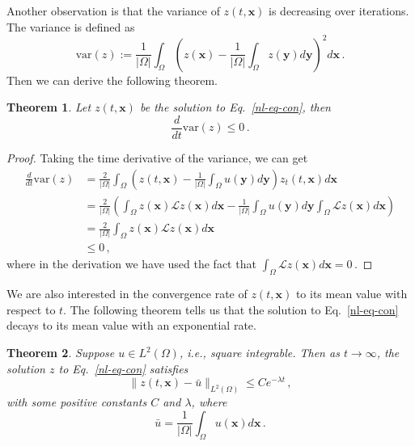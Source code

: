 \documentclass{article}
\newtheorem{theorem}{Theorem}
\newcommand{\xb}{\bm{x}}
\newcommand{\yb}{\bm{y}}
\begin{document}
Another observation is that the variance of $z(t,\xb)$ is decreasing over iterations. The variance is defined as
\begin{equation}
\text{var}(z):=\frac{1}{|\Omega|} \int_\Omega \left( z(\xb)-\frac{1}{|\Omega|}\int_\Omega z(\yb)d\yb \right)^2 d\xb\,.
\end{equation}
Then we can derive the following theorem.
\begin{theorem}
Let $z(t,\xb)$ be the solution to Eq.~\eqref{nl-eq-con}, then
\begin{equation}
\frac{d}{dt} \text{var}(z) \le 0\,.
\end{equation}
\end{theorem}
\begin{proof}
Taking the time derivative of the variance, we can get
\[
\begin{aligned}
\frac{d}{dt} \text{var}(z) &= \frac{2}{|\Omega|} \int_\Omega \left( z(t,\xb)-\frac{1}{|\Omega|}\int_\Omega u(\yb)d\yb\right) z_t(t,\xb) d\xb\\
&= \frac{2}{|\Omega|}\left(\int_\Omega z(\xb) \mathcal{L}z(\xb)d\xb - \frac{1}{|\Omega|}\int_\Omega u(\yb)d\yb \int_\Omega \mathcal{L}z(\xb)d\xb\right)\\
&=\frac{2}{|\Omega|}\int_\Omega z(\xb) \mathcal{L}z(\xb)d\xb\\
&\le 0\,,
\end{aligned}
\]
where in the derivation we have used the fact that $\int_\Omega \mathcal{L}z(\xb)d\xb = 0$\,.
\end{proof}


We are also interested in the convergence rate of $z(t,\xb)$ to its mean value with respect to $t$. The following theorem tells us that the solution to Eq.~\eqref{nl-eq-con} decays to its mean value with an exponential rate.
\begin{theorem}
Suppose $u\in L^2(\Omega)$, \textit{i.e.}, square integrable. Then as $t\to\infty$, the solution $z$ to Eq.~\eqref{nl-eq-con} satisfies
\begin{equation}
\|z(t,\xb)-\bar{u}\|_{L^2(\Omega)} \le C e^{-\lambda t} \,,
\end{equation}
with some positive constants $C$ and $\lambda$, where
\begin{equation}
\bar{u} = \frac{1}{|\Omega|} \int_\Omega u(\xb) d\xb\,.
\end{equation}
\end{theorem}
\end{document}
